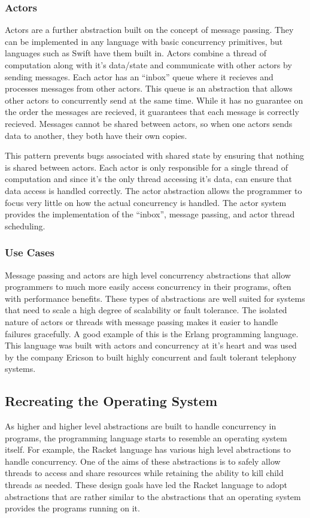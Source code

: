 \documentclass{article}
\begin{document}
\subsubsection{Actors}
Actors are a further abstraction built on the concept of message
passing. They can be implemented in any language with basic
concurrency primitives, but languages such as Swift have them built
in. Actors combine a thread of computation along with it's
data/state and communicate with other actors by sending messages.
Each actor has an ``inbox'' queue where it recieves and processes
messages from other actors. This queue is
an abstraction that allows other actors to concurrently send
at the same time. While it has no guarantee on the order the
messages are recieved, it guarantees that each message is correctly
recieved. Messages cannot be shared between actors, so when one
actors sends data to another, they both have their own copies.

This pattern prevents bugs associated with shared state by ensuring
that nothing is shared between actors. Each actor is only
responsible for a single thread of computation and since it's the
only thread accessing it's data, can ensure that data access is
handled correctly. The actor abstraction allows the programmer to
focus very little on how the actual concurrency is handled. The
actor system provides the implementation of the ``inbox'', message
passing, and actor thread scheduling.

\subsubsection{Use Cases}
Message passing and actors are high level concurrency abstractions
that allow programmers to much more easily access concurrency
in their programs, often with performance benefits. These types
of abstractions are well suited for systems that need to scale
a high degree of scalability or fault tolerance. The isolated
nature of actors or threads with message passing makes it easier
to handle failures gracefully. A good example of this is the Erlang
programming language. This language was built with actors and
concurrency at it's heart and was used by the company Ericson to
built highly concurrent and fault tolerant telephony systems.

\subsection{Recreating the Operating System}
As higher and higher level abstractions are built to handle
concurrency in programs, the programming language starts
to resemble an operating system itself. For example, the Racket
language has various high level abstractions to handle concurrency.
One of the aims of these abstractions is to safely allow threads to
access and share resources while retaining the ability to kill child
threads as needed. These design goals have led the Racket language
to adopt abstractions that are rather similar to the abstractions
that an operating system provides the programs running on it.
\end{document}
